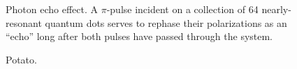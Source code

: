 \documentclass[conference]{IEEEtran}
\begin{document}
\begin{figure}
  \centering
  
  \caption{\label{fig:echo} Photon echo effect.
    A $\pi$-pulse incident on a collection of 64 nearly-resonant quantum dots serves to rephase their polarizations as an ``echo'' long after both pulses have passed through the system.
  }
\end{figure}

\begin{figure}
  \centering
  
  \caption{\label{fig:decoherence} Potato.}
\end{figure}

{}

\end{document}
